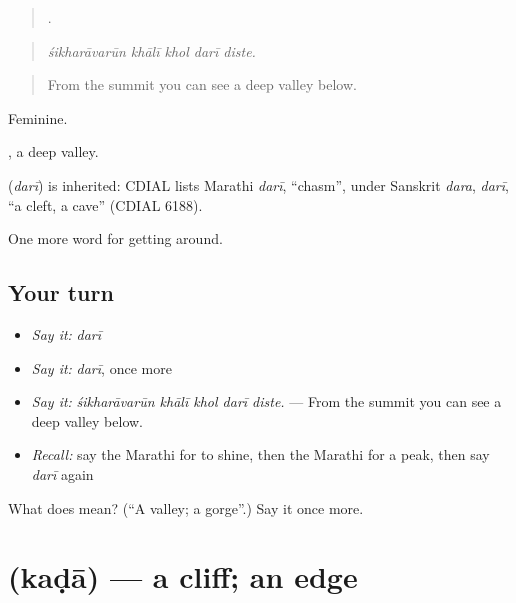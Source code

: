 \begin{quote}
    .
\end{quote}

\begin{quote}
\emph{śikharāvarūn khālī khol darī diste.}
\end{quote}

\begin{quote}
From the summit you can see a deep valley below.
\end{quote}

Feminine.

 , a deep valley.

\begin{cousinweb}
\textbf{} (\emph{darī}) is inherited: CDIAL lists Marathi \emph{darī}, \textquotedblleft{}chasm\textquotedblright{}, under Sanskrit \emph{dara}, \emph{darī}, \textquotedblleft{}a cleft, a cave\textquotedblright{} (CDIAL 6188).
\end{cousinweb}

\begin{grammarlens}[title={What you've built}]
One more word for getting around.
\end{grammarlens}

\subsection*{Your turn}
\begin{itemize}
\raggedright
  \item \emph{Say it:} \emph{darī}
  \item \emph{Say it:} \emph{darī}, once more
  \item \emph{Say it:} \emph{śikharāvarūn khālī khol darī diste.} — From the summit you can see a deep valley below.
  \item \emph{Recall:} say the Marathi for to shine, then the Marathi for a peak, then say \emph{darī} again
\end{itemize}

\begin{tcolorbox}[breakable,colback=teal!4,colframe=teal!35!black,title={Before you move on}]
What does  mean? (\textquotedblleft{}A valley; a gorge\textquotedblright{}.) Say it once more.
\end{tcolorbox}
\section[\texorpdfstring{\mr{कडा} (kaḍā)}{कडा (kaḍā)}]{ (kaḍā) — a cliff; an edge}

